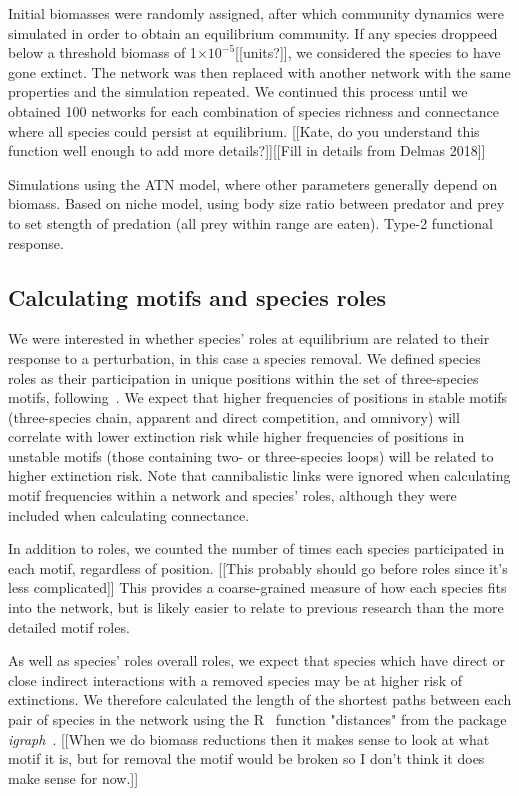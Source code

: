 \documentclass[12pt]{article}
\begin{document}
		Initial biomasses were randomly assigned, after which community dynamics were simulated in order to obtain an equilibrium community. If any species droppeed below a threshold biomass of 1$\times10^{-5}$[[units?]], we considered the species to have gone extinct. The network was then replaced with another network with the same properties and the simulation repeated. We continued this process until we obtained 100 networks for each combination of species richness and connectance where all species could persist at equilibrium. [[Kate, do you understand this function well enough to add more details?]][[Fill in details from Delmas 2018]]


		Simulations using the ATN model, where other parameters generally depend on biomass. Based on niche model, using body size ratio between predator and prey to set stength of predation (all prey within range are eaten). Type-2 functional response.


	\subsection*{Calculating motifs and species roles}

		We were interested in whether species' roles at equilibrium are related to their response to a perturbation, in this case a species removal. We defined species roles as their participation in unique positions within the set of three-species motifs, following~\citet{Stouffer2012,Cirtwill2015}. We expect that higher frequencies of positions in stable motifs (three-species chain, apparent and direct competition, and omnivory) will correlate with lower extinction risk while higher frequencies of positions in unstable motifs (those containing two- or three-species loops) will be related to higher extinction risk.	Note that cannibalistic links were ignored when calculating motif frequencies within a network and species' roles, although they were included when calculating connectance. 


		In addition to roles, we counted the number of times each species participated in each motif, regardless of position. [[This probably should go before roles since it's less complicated]] This provides a coarse-grained measure of how each species fits into the network, but is likely easier to relate to previous research than the more detailed motif roles.


		As well as species' roles overall roles, we expect that species which have direct or close indirect interactions with a removed species may be at higher risk of extinctions. We therefore calculated the length of the shortest paths between each pair of species in the network using the R~\citep{R} function "distances" from the package \emph{igraph}~\citep{igraph}. [[When we do biomass reductions then it makes sense to look at what motif it is, but for removal the motif would be broken so I don't think it does make sense for now.]]
\end{document}
